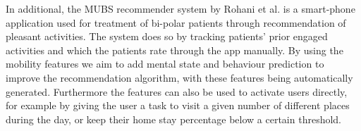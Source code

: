 In additional, the MUBS recommender system by Rohani et al. \cite{mubs-rohani} is a smart-phone application used for treatment of bi-polar patients through recommendation of pleasant activities. The system does so by tracking patients' prior engaged activities and which the patients rate through the app manually. By using the mobility features we aim to add mental state and behaviour prediction to improve the recommendation algorithm, with these features being automatically generated. Furthermore the features can also be used to activate users directly, for example by giving the user a task to visit a given number of different places during the day, or keep their home stay percentage below a certain threshold.